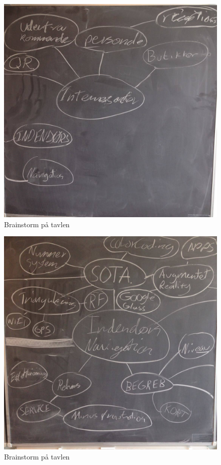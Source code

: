 \documentclass[a4paper,12pt,oneside,article]{memoir}
\begin{document}
        \begin{figure}
        \centering
                \includegraphics[width=\textwidth]{Images/3.jpg}
                \caption{Brainstorm på tavlen}
                \label{fig:struktur}
        \end{figure}

        \begin{figure}
        \centering
                \includegraphics[width=\textwidth]{Images/4.jpg}
                \caption{Brainstorm på tavlen}
                \label{fig:struktur2}
        \end{figure}
\end{document}
